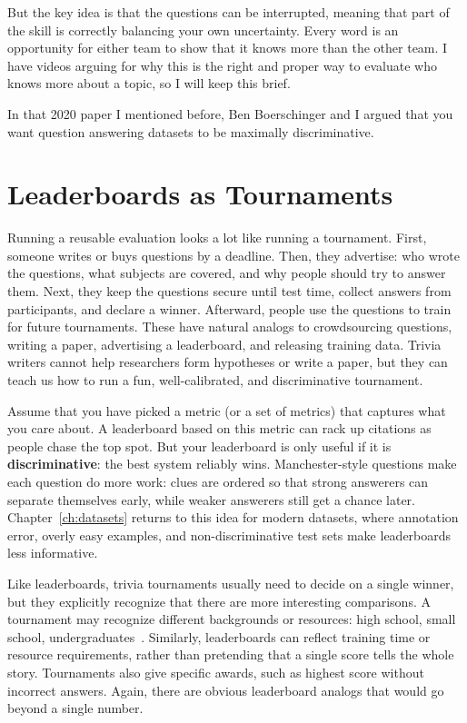 But the key idea is that the questions can be interrupted, meaning that part of the skill is correctly balancing your own uncertainty.  Every word is an opportunity for either team to show that it knows more than the other team.  I have videos arguing for why this is the right and proper way to evaluate who knows more about a topic, so I will keep this brief.  

In that 2020 paper I mentioned before, Ben Boerschinger and I argued that you want question answering datasets to be maximally discriminative. 

\section{Leaderboards as Tournaments}
\label{sec:discriminative}

Running a reusable evaluation looks a lot like running a tournament.
First, someone writes or buys questions by a deadline. Then, they advertise:
who wrote the questions, what subjects are covered, and why people should try
to answer them. Next, they keep the questions secure until test time, collect
answers from participants, and declare a winner. Afterward, people use the
questions to train for future tournaments. These have natural analogs to
crowdsourcing questions, writing a paper, advertising a leaderboard, and
releasing training data.
%
Trivia writers cannot help researchers form hypotheses or write a paper, but
they can teach us how to run a fun, well-calibrated, and discriminative
tournament.

Assume that you have picked a metric (or a set of metrics) that captures what
you care about. A leaderboard based on this metric can rack up citations as
people chase the top spot. But your leaderboard is only useful if it is
{\bf discriminative}: the best system reliably wins. Manchester-style questions
make each question do more work: clues are ordered so that strong answerers can
separate themselves early, while weaker answerers still get a chance later.
Chapter~\ref{ch:datasets} returns to this idea for modern  datasets,
where annotation error, overly easy examples, and non-discriminative test sets
make leaderboards less informative.

Like  leaderboards, trivia tournaments usually need to decide on a
single winner, but they explicitly recognize that there are more interesting
comparisons. A tournament may recognize different backgrounds or resources:
high school, small school, undergraduates~\citep{naqt-eligibility}. Similarly,
leaderboards can reflect training time or resource requirements, rather than
pretending that a single score tells the whole story. Tournaments also give
specific awards, such as highest score without incorrect answers. Again, there
are obvious leaderboard analogs that would go beyond a single number.

